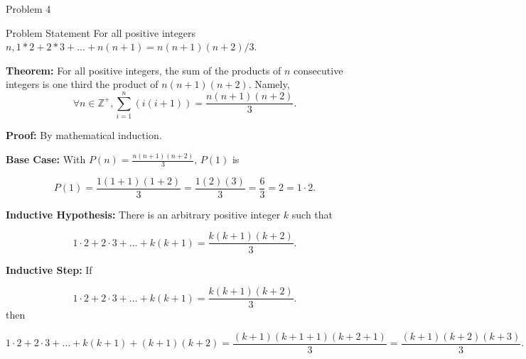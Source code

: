 \begin{problem}{Problem 4}
    \begin{statement}{Problem Statement}
        For all positive integers $n, 1*2 + 2*3 + \dots + n(n + 1) = n(n + 1)(n + 2)/3$.
    \end{statement}

    \begin{highlight}[Solution]
        \noindent \textbf{Theorem:} For all positive integers, the sum of the products of $n$ consecutive integers is one third the product of $n(n + 1)(n + 2)$. Namely,
        \begin{equation*}
            \forall n \in \mathbb{Z}^{+}, \sum_{i = 1}^{n}(i(i + 1)) = \frac{n(n + 1)(n + 2)}{3}.
        \end{equation*}

        \noindent \textbf{Proof:} By mathematical induction. \vspace*{1em}

        \noindent \textbf{Base Case:} With $P(n) = \frac{n(n + 1)(n + 2)}{3}$, $P(1)$ is 

        \begin{equation*}
            P(1) = \frac{1(1 + 1)(1 + 2)}{3} = \frac{1(2)(3)}{3} = \frac{6}{3} = 2 = 1 \cdot 2.
        \end{equation*}

        \noindent \textbf{Inductive Hypothesis:} There is an arbitrary positive integer $k$ such that 

        \begin{equation*}
            1 \cdot 2 + 2 \cdot 3 + \dots + k(k + 1) = \frac{k(k + 1)(k + 2)}{3}.
        \end{equation*}

        \noindent \textbf{Inductive Step:} If 

        \begin{equation*}
            1 \cdot 2 + 2 \cdot 3 + \dots + k(k + 1) = \frac{k(k + 1)(k + 2)}{3}.
        \end{equation*}
        then 

        \begin{equation*}
            1 \cdot 2 + 2 \cdot 3 + \dots + k(k + 1) + (k + 1)(k + 2) = \frac{(k + 1)(k + 1 + 1)(k + 2 + 1)}{3} = \frac{(k + 1)(k + 2)(k + 3)}{3}.
        \end{equation*}


\end{highlight}
\end{problem}
